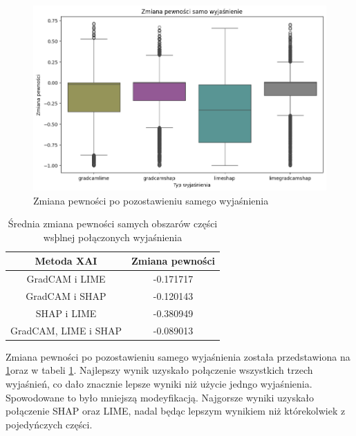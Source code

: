 \begin{figure}[h]
	\centering\includegraphics[width=.9\textwidth]{img/combine_confidence_exp_or}
	\caption{Zmiana pewności po pozostawieniu samego wyjaśnienia}  \label{rys:combineandconfidenceor}
\end{figure}
\begin{table}[h]
	\centering
	\begin{tabular}{|c|c|}
		\hline
		\textbf{Metoda XAI}  & Zmiana pewności \\
		\hline
		GradCAM i LIME       & -0.171717       \\
		\hline
		GradCAM i SHAP       & -0.120143       \\
		\hline
		SHAP i LIME          & -0.380949       \\
		\hline
		GradCAM, LIME i SHAP & -0.089013       \\
		\hline
	\end{tabular}
	\caption{Średnia zmiana pewności samych obszarów części wsþlnej połączonych wyjaśnienia}
	\label{tab:combineandconfidenceor}
\end{table}
Zmiana pewności po pozostawieniu samego wyjaśnienia została przedstawiona na \ref{rys:combineandconfidenceor}oraz w tabeli \ref{tab:combineandconfidenceor}.
Najlepszy wynik uzyskało połączenie wszystkich trzech wyjaśnień, co dało znacznie lepsze wyniki niż użycie jedngo wyjaśnienia.
Spowodowane to było mniejszą modeyfikacją.
Najgorsze wyniki uzyskało połączenie SHAP oraz LIME, nadal będąc lepszym wynikiem niż którekolwiek z pojedyńczych części.

